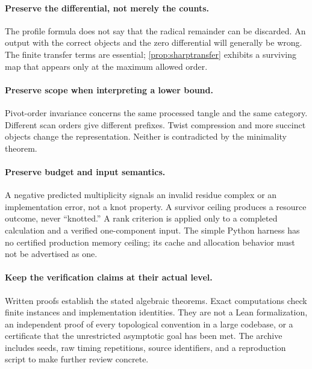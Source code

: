 \documentclass[11pt,letterpaper]{article}
\theoremstyle{definition}
\theoremstyle{remark}
\begin{document}
\paragraph{Preserve the differential, not merely the counts.}
The profile formula does not say that the radical remainder can be discarded.
An output with the correct objects and the zero differential will generally be
wrong. The finite transfer terms are essential; \cref{prop:sharptransfer}
exhibits a surviving map that appears only at the maximum allowed order.

\paragraph{Preserve scope when interpreting a lower bound.}
Pivot-order invariance concerns the same processed tangle and the same category.
Different scan orders give different prefixes. Twist compression and more
succinct objects change the representation. Neither is contradicted by the
minimality theorem.

\paragraph{Preserve budget and input semantics.}
A negative predicted multiplicity signals an invalid residue complex or an
implementation error, not a knot property. A survivor ceiling produces a
resource outcome, never ``knotted.'' A rank criterion is applied only to a
completed calculation and a verified one-component input. The simple Python
harness has no certified production memory ceiling; its cache and allocation
behavior must not be advertised as one.

\paragraph{Keep the verification claims at their actual level.}
Written proofs establish the stated algebraic theorems. Exact computations
check finite instances and implementation identities. They are not a Lean
formalization, an independent proof of every topological convention in a large
codebase, or a certificate that the unrestricted asymptotic goal has been met.
The archive includes seeds, raw timing repetitions, source identifiers, and a
reproduction script to make further review concrete.
\end{document}
